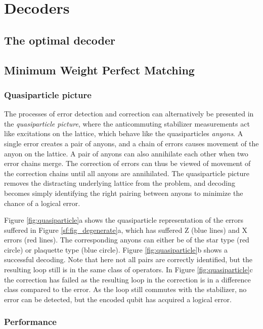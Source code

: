 \chapter{Decoders}\label{ch:surface_decoders}
\section{The optimal decoder}\label{sec:optimal_decoder}
\section{Minimum Weight Perfect Matching}\label{sec:MWPMdecoder}


\subsection{Quasiparticle picture}
The processes of error detection and correction can alternatively be presented in the \emph{quasiparticle picture}, where the anticommuting stabilizer measurements act like excitations on the lattice, which behave like the quasiparticles \emph{anyons}. A single error creates a pair of anyons, and a chain of errors causes movement of the anyon on the lattice. A pair of anyons can also annihilate each other when two error chains merge. The correction of errors can thus be viewed of movement of the correction chains until all anyons are annihilated. The quasiparticle picture removes the distracting underlying lattice from the problem, and decoding becomes simply identifying the right pairing between anyons to minimize the chance of a logical error.

Figure \ref{fig:quasiparticle}a shows the quasiparticle representation of the errors suffered in Figure \ref{sf:fig_degenerate}a, which has suffered Z (blue lines) and X errors (red lines). The corresponding anyons can either be of the star type (red circle) or plaquette type (blue circle). Figure \ref{fig:quasiparticle}b shows a successful decoding. Note that here not all pairs are correctly identified, but the resulting loop still is in the same class of operators. In Figure \ref{fig:quasiparticle}c the correction has failed as the resulting loop in the correction is in a difference class compared to the error. As the loop still commutes with the stabilizer, no error can be detected, but the encoded qubit has acquired a logical error.



\subsection{Performance}

